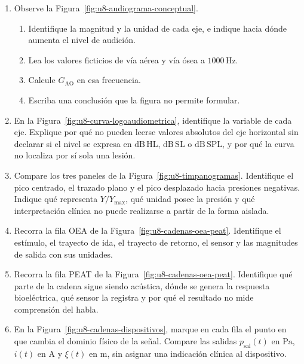 \begin{enumerate}[label=\textbf{G\arabic*.},leftmargin=*]
    \item Observe la Figura~\ref{fig:u8-audiograma-conceptual}.
    \begin{enumerate}
        \item Identifique la magnitud y la unidad de cada eje, e indique hacia
        dónde aumenta el nivel de audición.
        \item Lea los valores ficticios de vía aérea y vía ósea a
        \(1000\,\mathrm{Hz}\).
        \item Calcule \(G_{\mathrm{AO}}\) en esa frecuencia.
        \item Escriba una conclusión que la figura no permite formular.
    \end{enumerate}

    \item En la Figura~\ref{fig:u8-curva-logoaudiometrica}, identifique la
    variable de cada eje. Explique por qué no pueden leerse valores absolutos
    del eje horizontal sin declarar si el nivel se expresa en
    \(\mathrm{dB\,HL}\), \(\mathrm{dB\,SL}\) o \(\mathrm{dB\,SPL}\), y por qué
    la curva no localiza por sí sola una lesión.

    \item Compare los tres paneles de la
    Figura~\ref{fig:u8-timpanogramas}. Identifique el pico centrado, el trazado
    plano y el pico desplazado hacia presiones negativas. Indique qué
    representa \(Y/Y_{\max}\), qué unidad posee la presión y qué interpretación
    clínica no puede realizarse a partir de la forma aislada.

    \item Recorra la fila OEA de la
    Figura~\ref{fig:u8-cadenas-oea-peat}. Identifique el estímulo, el trayecto
    de ida, el trayecto de retorno, el sensor y las magnitudes de salida con
    sus unidades.

    \item Recorra la fila PEAT de la
    Figura~\ref{fig:u8-cadenas-oea-peat}. Identifique qué parte de la cadena
    sigue siendo acústica, dónde se genera la respuesta bioeléctrica, qué
    sensor la registra y por qué el resultado no mide comprensión del habla.

    \item En la Figura~\ref{fig:u8-cadenas-dispositivos}, marque en cada fila el
    punto en que cambia el dominio físico de la señal. Compare las salidas
    \(p_{\mathrm{sal}}(t)\) en \(\mathrm{Pa}\), \(i(t)\) en
    \(\mathrm{A}\) y \(\xi(t)\) en \(\mathrm{m}\), sin asignar una indicación
    clínica al dispositivo.
\end{enumerate}

